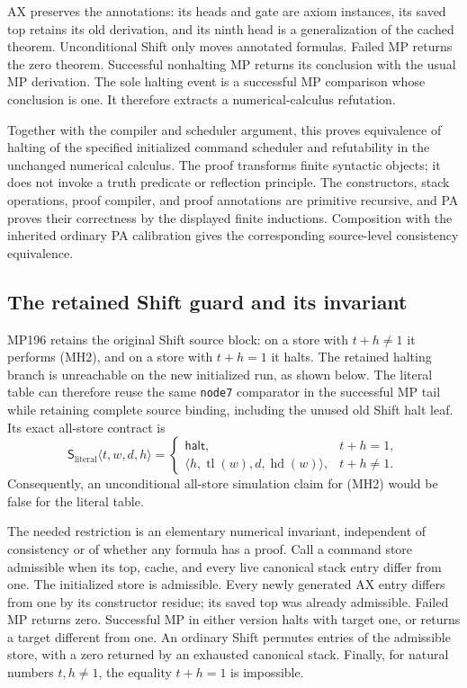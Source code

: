 AX preserves the annotations: its heads and gate are axiom instances,
its saved top retains its old derivation, and its ninth head is a
generalization of the cached theorem. Unconditional Shift only moves
annotated formulas. Failed MP returns the zero theorem. Successful
nonhalting MP returns its conclusion with the usual MP derivation.
The sole halting event is a successful MP comparison whose conclusion
is one. It therefore extracts a numerical-calculus refutation.

Together with the compiler and scheduler argument, this proves
equivalence of halting of the specified initialized command scheduler
and refutability in the unchanged numerical calculus. The proof transforms
finite syntactic objects; it does not invoke a truth predicate or
reflection principle. The constructors, stack operations, proof compiler,
and proof annotations are primitive recursive, and PA proves their
correctness by the displayed finite inductions. Composition with the
inherited ordinary PA calibration gives the corresponding source-level
consistency equivalence.

\subsection{The retained Shift guard and its invariant}

MP196 retains the original Shift source block: on a store with
$t+h\ne1$ it performs (MH2), and on a store with $t+h=1$ it halts.
The retained halting branch is unreachable on the new initialized run,
as shown below. The literal table can therefore reuse the same
\texttt{node7} comparator in the successful MP tail while retaining
complete source binding, including the unused old Shift halt leaf.
Its exact all-store contract is
\[
 \mathsf S_{\mathrm{literal}}\langle t,w,d,h\rangle=
 \begin{cases}
  \mathsf{halt},&t+h=1,\\
  \langle h,\operatorname{tl}(w),d,\operatorname{hd}(w)\rangle,&t+h\ne1.
 \end{cases}
 \tag{MH15}
\]
Consequently, an unconditional all-store simulation claim for (MH2)
would be false for the literal table.

The needed restriction is an elementary numerical invariant, independent
of consistency or of whether any formula has a proof. Call a command
store admissible when its top, cache, and every live canonical stack
entry differ from one. The initialized store is admissible. Every newly
generated AX entry differs from one by its constructor residue; its saved
top was already admissible. Failed MP returns zero. Successful MP in
either version halts with target one, or returns a target different
from one. An ordinary Shift permutes entries of the admissible store,
with a zero returned by an exhausted canonical stack. Finally, for
natural numbers $t,h\ne1$, the equality $t+h=1$ is impossible.

